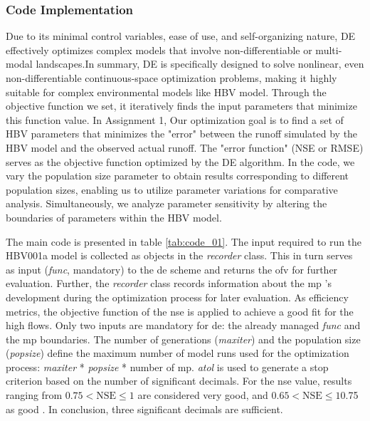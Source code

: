 \subsubsection{Code Implementation}
Due to its minimal control variables, ease of use, and self-organizing nature, DE effectively optimizes complex models that involve non-differentiable or multi-modal landscapes.In summary, DE is specifically designed to solve nonlinear, even non-differentiable continuous-space optimization problems, making it highly suitable for complex environmental models like HBV model. Through the objective function we set, it iteratively finds the input parameters that minimize this function value. In Assignment 1, Our optimization goal is to find a set of HBV parameters that minimizes the "error" between the runoff simulated by the HBV model and the observed actual runoff. The "error function" (NSE or RMSE) serves as the objective function optimized by the DE algorithm.
In the code, we vary the population size parameter to obtain results corresponding to different population sizes, enabling us to utilize parameter variations for comparative analysis. Simultaneously, we analyze parameter sensitivity by altering the boundaries of parameters within the HBV model.


The main code is presented in table \ref{tab:code_01}. The input required to run the HBV001a model is collected as objects in the \textit{recorder} class. This in turn serves as input (\textit{func}, mandatory) to the \ac{de} scheme and returns the \ac{ofv} for further evaluation. Further, the \textit{recorder} class records information about the \ac{mp} 's development during the optimization process for later evaluation. As efficiency metrics, the objective function of the \ac{nse} is applied to achieve a good fit for the high flows. Only two inputs are mandatory for \ac{de}: the already managed \textit{func} and the \ac{mp} boundaries. The number of generations (\textit{maxiter}) and the population size (\textit{popsize}) define the maximum number of model runs used for the optimization process: \textit{maxiter} * \textit{popsize} * number of \ac{mp}. \textit{atol} is used to generate a stop criterion based on the number of significant decimals. For the \ac{nse} value, results ranging from $0.75 < \mathrm{NSE} \le 1$ are considered very good, and $0.65 < \mathrm{NSE} \le 1$0.75 as good \autocite{Moriasi.2007}. In conclusion, three significant decimals are sufficient. 

